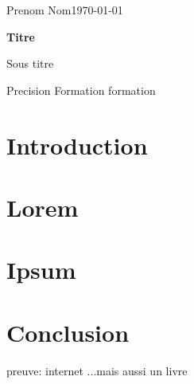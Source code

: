 \documentclass[12pt]{article}
\newcommand{\nomEntier}{Prenom Nom} %
\newcommand{\dateRendu}{\today} %
\newcommand{\titreDoc}{Titre} %
\newcommand{\sousTitreDoc}{Sous titre} %
\newcommand{\sousSousTitreDoc}{Precision} %
\newcommand{\formation}{formation} %
\newcommand{\pageDeTitre}{
\begin{titlepage}
    \nomEntier \hfill \dateRendu
    \begin{center}
        \vspace*{7cm}
        
        \Huge
        \textbf{\titreDoc}
 
        \vspace{0.5cm}
        \LARGE
        \sousTitreDoc

        \vspace{0.5cm}
        \large
        \sousSousTitreDoc
        \vfill
        {\footnotesize Formation \formation}
    \end{center}
 \end{titlepage}
 \thispagestyle{fancy}
\newpage
}
\begin{document}
\pageDeTitre

\tableofcontents
\newpage

\section{Introduction}
\lipsum[1-2]
\section{Lorem}
\lipsum
\section{Ipsum}
\lipsum
\section{Conclusion}
\lipsum[1-2]

\cite{WEBSITE:1}{preuve: internet}
\cite{BOOK:1}{...mais aussi un livre}

\printbibliography
\end{document}
